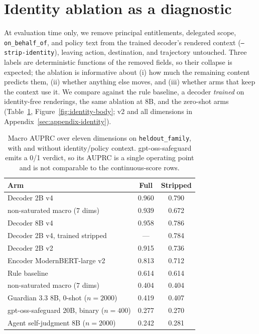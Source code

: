 \section{Identity ablation as a diagnostic}
\label{sec:identity}

At evaluation time only, we remove principal entitlements, delegated scope,
\texttt{on\_behalf\_of}, and policy text from the trained decoder's rendered
context (\texttt{--strip-identity}), leaving action, destination, and
trajectory untouched. Three labels are deterministic functions of the removed
fields, so their collapse is expected; the ablation is informative about
(i) how much the remaining content predicts them, (ii) whether anything else
moves, and (iii) whether arms that keep the context use it. We compare
against the rule baseline, a decoder \emph{trained} on identity-free
renderings, the same ablation at 8B, and the zero-shot arms
(Table~\ref{tab:macro-summary}, Figure~\ref{fig:identity-body}; v2 and all
dimensions in Appendix~\ref{sec:appendix-identity}).

\begin{table}[t]
\centering
\footnotesize
\begin{tabular}{@{}lcc@{}}
\toprule
Arm & Full & Stripped \\
\midrule
Decoder 2B v4 & 0.960 & 0.790 \\
\quad non-saturated macro (7 dims) & 0.939 & 0.672 \\
Decoder 8B v4 & 0.958 & 0.786 \\
Decoder 2B v4, trained stripped & --- & 0.784 \\
Decoder 2B v2 & 0.915 & 0.736 \\
Encoder ModernBERT-large v2 & 0.813 & 0.712 \\
Rule baseline & 0.614 & 0.614 \\
\quad non-saturated macro (7 dims) & 0.404 & 0.404 \\
Guardian 3.3 8B, 0-shot ($n{=}2000$) & 0.419 & 0.407 \\
gpt-oss-safeguard 20B, binary ($n{=}400$) & 0.277 & 0.270 \\
Agent self-judgment 8B ($n{=}2000$) & 0.242 & 0.281 \\
\bottomrule
\end{tabular}
\caption{Macro AUPRC over eleven dimensions on \texttt{heldout\_family}, with and without identity/policy context. gpt-oss-safeguard emits a 0/1 verdict, so its AUPRC is a single operating point and is not comparable to the continuous-score rows.}
\label{tab:macro-summary}
\end{table}

